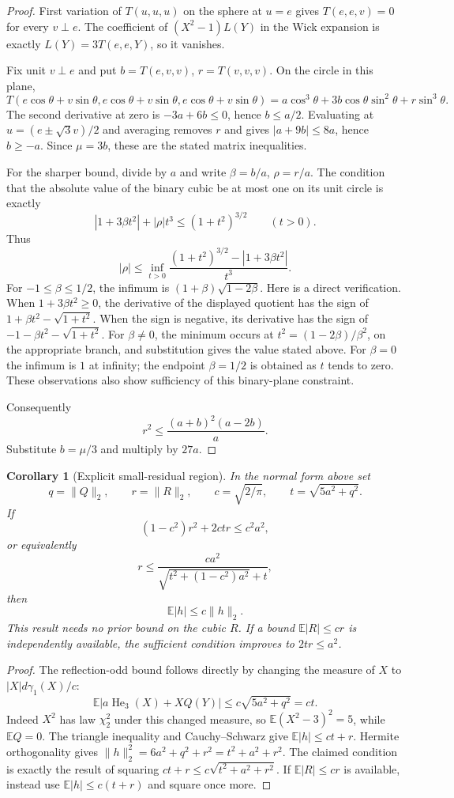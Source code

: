 \documentclass[11pt]{article}
\newtheorem{corollary}{Corollary}
\newcommand{\E}{\mathbb E}
\newcommand{\He}{\operatorname{He}}
\begin{document}
\begin{proof}
First variation of $T(u,u,u)$ on the sphere at $u=e$ gives
$T(e,e,v)=0$ for every $v\perp e$. The coefficient of
$(X^2-1)L(Y)$ in the Wick expansion is exactly
$L(Y)=3T(e,e,Y)$, so it vanishes.

Fix unit $v\perp e$ and put $b=T(e,v,v)$, $r=T(v,v,v)$.
On the circle in this plane,
\[
 T(e\cos\theta+v\sin\theta,e\cos\theta+v\sin\theta,e\cos\theta+v\sin\theta)
 =a\cos^3\theta+3b\cos\theta\sin^2\theta+r\sin^3\theta.
\]
The second derivative at zero is $-3a+6b\leq0$, hence $b\leq a/2$.
Evaluating at $u=(e\pm\sqrt3v)/2$ and averaging removes $r$ and gives
$|a+9b|\leq8a$, hence $b\geq-a$. Since $\mu=3b$, these are the stated
matrix inequalities.

For the sharper bound, divide by $a$ and write $\beta=b/a$, $\rho=r/a$.
The condition that the absolute value of the binary cubic be at most one
on its unit circle is exactly
\[
 |1+3\beta t^2|+|\rho|t^3\leq(1+t^2)^{3/2}\qquad(t>0).
\]
Thus
\[
 |\rho|\leq\inf_{t>0}
 \frac{(1+t^2)^{3/2}-|1+3\beta t^2|}{t^3}.
\]
For $-1\leq\beta\leq1/2$, the infimum is
$(1+\beta)\sqrt{1-2\beta}$. Here is a direct verification. When
$1+3\beta t^2\geq0$, the derivative of the displayed quotient has the
sign of $1+\beta t^2-\sqrt{1+t^2}$. When the sign is negative, its derivative
has the sign of $-1-\beta t^2-\sqrt{1+t^2}$. For $\beta\ne0$, the minimum
occurs at $t^2=(1-2\beta)/\beta^2$, on the appropriate branch, and substitution
gives the value stated above. For $\beta=0$ the infimum is $1$ at infinity;
the endpoint $\beta=1/2$ is obtained as $t$ tends to zero. These observations
also show sufficiency of this binary-plane constraint.

Consequently
\[
 r^2\leq\frac{(a+b)^2(a-2b)}a.
\]
Substitute $b=\mu/3$ and multiply by $27a$.
\end{proof}

\begin{corollary}[Explicit small-residual region]
In the normal form above set
\[
 q=\|Q\|_2,\qquad r=\|R\|_2,\qquad
 c=\sqrt{2/\pi},\qquad t=\sqrt{5a^2+q^2}.
\]
If
\[
 (1-c^2)r^2+2ctr\leq c^2a^2,
\]
or equivalently
\[
 r\leq\frac{c a^2}{\sqrt{t^2+(1-c^2)a^2}+t},
\]
then
\[
 \E|h|\leq c\|h\|_2.
\]
This result needs no prior bound on the cubic $R$.
If a bound $\E|R|\leq cr$ is independently available, the sufficient
condition improves to $2tr\leq a^2$.
\end{corollary}

\begin{proof}
The reflection-odd bound follows directly by changing the measure of $X$ to
$|X|d\gamma_1(X)/c$:
\[
 \E|a\He_3(X)+XQ(Y)|\leq c\sqrt{5a^2+q^2}=ct.
\]
Indeed $X^2$ has law $\chi^2_2$ under this changed measure, so
$\E(X^2-3)^2=5$, while $\E Q=0$. The triangle inequality and
Cauchy--Schwarz give $\E|h|\leq ct+r$.
Hermite orthogonality gives $\|h\|_2^2=6a^2+q^2+r^2=t^2+a^2+r^2$.
The claimed condition is exactly the result of squaring
$ct+r\leq c\sqrt{t^2+a^2+r^2}$. If $\E|R|\leq cr$ is available, instead
use $\E|h|\leq c(t+r)$ and square once more.
\end{proof}
\end{document}
